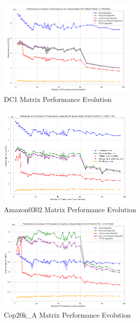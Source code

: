 \documentclass[12pt,oneside]{book} %
\begin{document}
\begin{figure}[H]
    \centering
    \includegraphics[width=0.6\textwidth]{../results/matrix_dim/dc1_k6_performance.png}
    \caption{DC1 Matrix Performance Evolution}\label{fig:dc1-k6-performance}
\end{figure}

\begin{figure}[H]
    \centering
    \includegraphics[width=0.6\textwidth]{../results/matrix_dim/amazon0302_k6_performance.png}
    \caption{Amazon0302 Matrix Performance Evolution}\label{fig:amazon0302-k6-performance}
\end{figure}

\begin{figure}[H]
    \centering
    \includegraphics[width=0.6\textwidth]{../results/matrix_dim/cop20k_A_k6_performance.png}
    \caption{Cop20k\_A Matrix Performance Evolution}\label{fig:cop20k-a-k6-performance-1}
\end{figure}
\end{document}
